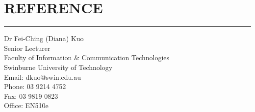 \documentclass{article}
\def\sectionskip{\medskip} %
\begin{document}
\section*{REFERENCE}
\hrule %
\sectionskip
	
	Dr Fei-Ching (Diana) Kuo \\
	Senior Lecturer \\
	Faculty of Information \& Communication Technologies \\
	Swinburne University of Technology \\
	Email: dkuo@swin.edu.au \\
	Phone: 03 9214 4752 \\
	Fax: 03 9819 0823 \\
	Office: EN510e \\
	
\end{document}
